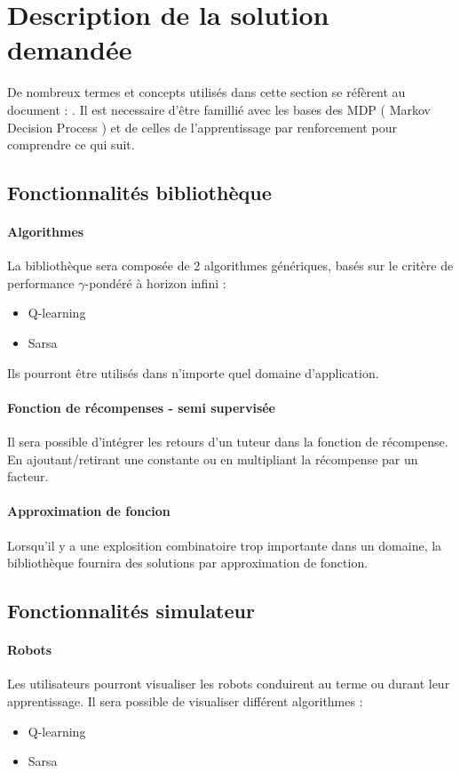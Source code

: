 \documentclass[a4paper,12pt]{article}
\begin{document}
  \vfill

  \newpage 
  \section{Description de la solution demandée}
	De nombreux termes et concepts utilisés dans cette section se réfèrent au document : \cite{PDMIA}. 
	Il est necessaire d'être famillié avec les bases des MDP ( Markov Decision Process ) et de celles 
	de l'apprentissage par renforcement pour comprendre ce qui suit.
	\subsection{Fonctionnalités bibliothèque}
		\paragraph{Algorithmes} La bibliothèque sera composée de 2 algorithmes génériques, basés sur le critère 
		de performance $\gamma$-pondéré à horizon infini : 
		  \begin{itemize}
			  \item Q-learning
			  \item Sarsa
		  \end{itemize}
		 Ils pourront être utilisés dans n'importe quel domaine d'application.
		  
		\paragraph{Fonction de récompenses - semi supervisée} Il sera possible d'intégrer les retours d'un 
			tuteur dans la fonction de récompense. En ajoutant/retirant une constante 
			ou en multipliant la récompense par un facteur.
		\paragraph{Approximation de foncion} Lorsqu'il y a une explosition combinatoire trop importante dans
		un domaine, la bibliothèque fournira des solutions par approximation de fonction.

	\subsection{Fonctionnalités simulateur}
		\paragraph{Robots} Les utilisateurs pourront visualiser les robots conduirent au terme ou durant leur
		apprentissage. Il sera possible de visualiser différent algorithmes :
		    \begin{itemize}
		      \item Q-learning
		      \item Sarsa
		    \end{itemize}
\end{document}
